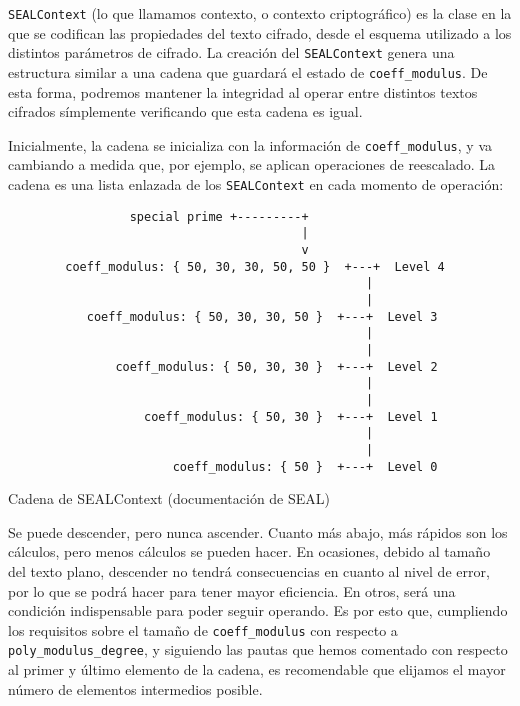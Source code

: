 \verb|SEALContext| (lo que llamamos contexto, o contexto criptográfico) es la clase en la que se codifican las propiedades del texto cifrado, desde el esquema utilizado a los distintos parámetros de cifrado. La creación del \verb|SEALContext| genera una estructura similar a una cadena que guardará el estado de \verb|coeff_modulus|. De esta forma, podremos mantener la integridad al operar entre distintos textos cifrados símplemente verificando que esta cadena es igual.

Inicialmente, la cadena se inicializa con la información de \verb|coeff_modulus|, y va cambiando a medida que, por ejemplo, se aplican operaciones de reescalado. La cadena es una lista enlazada de los \verb|SEALContext| en cada momento de operación:

\begin{listing}[ht]
    \begin{verbatim}
                 special prime +---------+
                                         |
                                         v
        coeff_modulus: { 50, 30, 30, 50, 50 }  +---+  Level 4
                                                  |
                                                  |
           coeff_modulus: { 50, 30, 30, 50 }  +---+  Level 3
                                                  |
                                                  |
               coeff_modulus: { 50, 30, 30 }  +---+  Level 2
                                                  |
                                                  |
                   coeff_modulus: { 50, 30 }  +---+  Level 1
                                                  |
                                                  |
                       coeff_modulus: { 50 }  +---+  Level 0
    \end{verbatim}
    \caption{Cadena de SEALContext (documentación de SEAL)}
    \label{fig:seal_levels}
\end{listing}

Se puede descender, pero nunca ascender. Cuanto más abajo, más rápidos son los cálculos, pero menos cálculos se pueden hacer. En ocasiones, debido al tamaño del texto plano, descender no tendrá consecuencias en cuanto al nivel de error, por lo que se podrá hacer para tener mayor eficiencia. En otros, será una condición indispensable para poder seguir operando. Es por esto que, cumpliendo los requisitos sobre el tamaño de \verb|coeff_modulus| con respecto a \verb|poly_modulus_degree|, y siguiendo las pautas que hemos comentado con respecto al primer y último elemento de la cadena, es recomendable que elijamos el mayor número de elementos intermedios posible.

